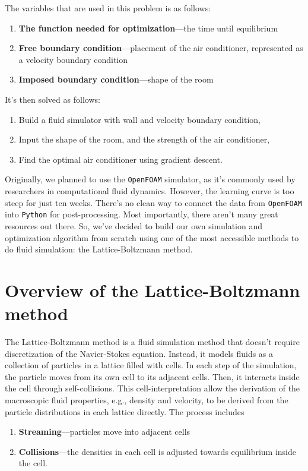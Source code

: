 The variables that are used in this problem is as follows:
\begin{enumerate}[noitemsep]
	\item \textbf{The function needed for optimization}---the time until equilibrium
	\item \textbf{Free boundary condition}---placement of the air conditioner, represented as a velocity boundary condition
	\item \textbf{Imposed boundary condition}---shape of the room
\end{enumerate}
It's then solved as follows:
\begin{enumerate}[noitemsep]
	\item Build a fluid simulator with wall and velocity boundary condition,
	\item Input the shape of the room, and the strength of the air conditioner,
	\item Find the optimal air conditioner using gradient descent.
\end{enumerate}

Originally, we planned to use the \texttt{OpenFOAM} simulator, as it's commonly used by researchers in computational fluid dynamics. However, the learning curve is too steep for just ten weeks. There's no clean way to connect the data from \texttt{OpenFOAM} into \texttt{Python} for post-processing. Most importantly, there aren't many great resources out there. So, we've decided to build our own simulation and optimization algorithm from scratch using one of the most accessible methods to do fluid simulation: the Lattice-Boltzmann method.

\section{Overview of the Lattice-Boltzmann method}

The Lattice-Boltzmann method is a fluid simulation method that doesn't require discretization of the Navier-Stokes equation. Instead, it models fluids as a collection of particles in a lattice filled with cells. In each step of the simulation, the particle moves from its own cell to its adjacent cells. Then, it interacts inside the cell through self-collisions. This cell-interpretation allow the derivation of the macroscopic fluid properties, e.g., density and velocity, to be derived from the particle distributions in each lattice directly. The process includes
\begin{enumerate}
	\item \textbf{Streaming}---particles move into adjacent cells
	\item \textbf{Collisions}---the densities in each cell is adjusted towards equilibrium inside the cell.
\end{enumerate}

